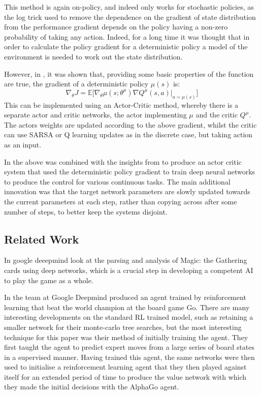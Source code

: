 This method is again on-policy, and indeed only works for stochastic policies, as the log trick used to remove the dependence on the gradient of state distribution from the performance gradient depends on the policy having a non-zero probability of taking any action. Indeed, for a long time it was thought that in order to calculate the policy gradient for a deterministic policy a model of the environment is needed to work out the state distribution.

However, in \cite{silver2014deterministic}, it was shown that, providing some basic properties of the function are true, the gradient of a deterministic policy $\mu(s)$ is:
\begin{equation}
\nabla_\theta J =\mathbb{E}\big[ \nabla_\theta  \mu ( s ; \theta^\mu) \nabla Q^\mu (s,a)|_{a = \mu(s)}\big]
\end{equation}
This can be implemented using an Actor-Critic method, whereby there is a separate actor and critic networks, the actor implementing $\mu$ and the critic $Q^\mu$. The actors weights are updated according to the above gradient, whilst the critic can use SARSA or Q learning updates as in the discrete case, but taking action as an input.

In \cite{lillicrap2015continuous} the above was combined with the insights from \cite{atariDQN} to produce an actor critic system that used the deterministic policy gradient to train deep neural networks to produce the control for various continuous tasks. The main additional innovation was that the target network parameters are slowly updated towards the current parameters at each step, rather than copying across after some number of steps, to better keep the systems disjoint.

\subsection{Related Work}
In \cite{ling2016latent} %
google deeepmind look at the parsing and analysis of Magic: the Gathering cards using deep networks, which is a crucial step in developing a competent AI to play the game as a whole.

In \cite{alphaGo} the team at Google Deepmind produced an agent trained by reinforcement learning that beat the world champion at the board game Go. There are many interesting developments on the standard RL trained model, such as retaining a smaller network for their monte-carlo tree searches, but the most interesting technique for this paper was their method of initially training the agent. They first taught the agent to predict expert moves from a large series of board states in a supervised manner. Having trained this agent, the same networks were then used to initialise a reinforcement learning agent that they then played against itself for an extended period of time to produce the value network with which they made the initial decisions with the AlphaGo agent. 

